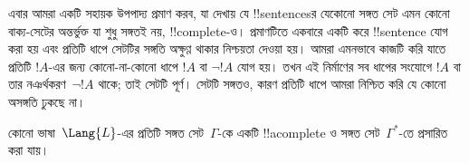 \documentclass[../../../include/open-logic-section]{subfiles}
\begin{document}
      {}
      {}


\begin{explain}
এবার আমরা একটি সহায়ক উপপাদ্য প্রমাণ করব, যা দেখায় যে
!!{sentence}sর যেকোনো সঙ্গত সেট এমন কোনো বাক্য-সেটের অন্তর্ভুক্ত যা
শুধু সঙ্গতই নয়, !!{complete}-ও। প্রমাণটিতে একবারে একটি করে !!{sentence}
যোগ করা হয় এবং প্রতিটি ধাপে সেটটির সঙ্গতি অক্ষুণ্ণ থাকার নিশ্চয়তা দেওয়া
হয়। আমরা এমনভাবে কাজটি করি যাতে প্রতিটি $!A$-এর জন্য কোনো-না-কোনো ধাপে
$!A$ বা $\lnot !A$ যোগ হয়। তখন এই নির্মাণের সব ধাপের সংযোগে $!A$ বা তার
নঞর্থকরণ~$\lnot !A$ থাকে; তাই সেটটি পূর্ণ। সেটটি সঙ্গতও, কারণ প্রতিটি
ধাপে আমরা নিশ্চিত করি যে কোনো অসঙ্গতি ঢুকছে না।
\end{explain}

\begin{lem}[লিন্ডেনবাউমের সহায়ক উপপাদ্য]
 কোনো ভাষা~$\Lang{L}$-এর প্রতিটি সঙ্গত
সেট~$\Gamma$-কে একটি !!a{complete} ও সঙ্গত সেট~$\Gamma^*$-তে প্রসারিত
করা যায়।
\end{lem}
\end{document}
